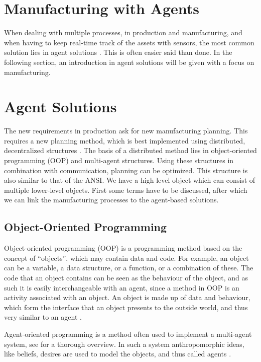 \section*{Manufacturing with Agents}
When dealing with multiple processes, in  production and manufacturing, and when having to keep real-time track of the assets with sensors, the most common solution lies in agent solutions \citep{leitao2013past, monostori2016cyber}. This is often easier said than done. In the following section, an introduction in agent solutions will be given with a focus on manufacturing. 

\newpage
\section{Agent Solutions}
The new requirements in production ask for new manufacturing planning. This requires a new planning method, which is best implemented using distributed, decentralized structures \citep{parunak1999industrial}. The basis of a distributed method lies in object-oriented programming (OOP) and multi-agent structures. Using these structures in combination with communication, planning can be optimized. This structure is also similar to that of the ANSI. We have a high-level object which can consist of multiple lower-level objects. First some terms have to be discussed, after which we can link the manufacturing processes to the agent-based solutions.

\subsection{Object-Oriented Programming}

Object-oriented programming (OOP) is a programming method based on the concept of ``objects'', which may contain data and code. For example, an object can be a variable, a data structure, or a function, or a combination of these. The code that an object contains can be seen as the behaviour of the object, and as such it is easily interchangeable with an agent, since a method in OOP is an activity associated with an object. An object is made up of data and behaviour, which form the interface that an object presents to the outside world, and thus very similar to an agent \citep{shoham1993agent}.

Agent-oriented programming is a method often used to implement a multi-agent system, see \citep{mahar2012agent} for a thorough overview. In such a system anthropomorphic ideas, like beliefs, desires are used to model the objects, and thus called agents \citep{shoham1993agent}.%

